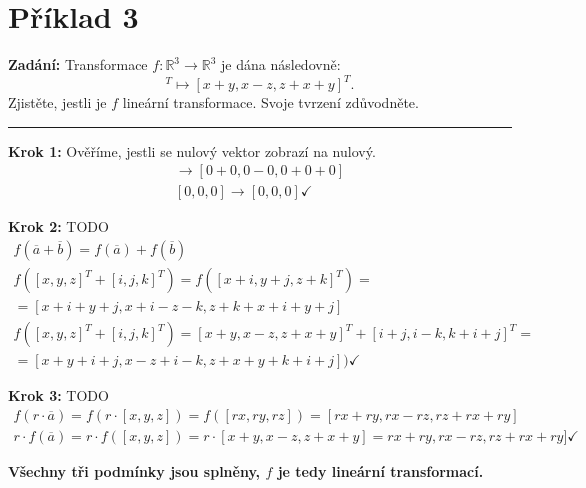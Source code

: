 \section{Příklad 3}
\textbf{Zadání:} Transformace $f: \mathbb{R}^3 \xrightarrow{} \mathbb{R}^3$ je dána následovně:
\begin{displaymath}
[x, y, z]^T \mapsto [x+y, x-z, z+x+y]^T.
\end{displaymath}
Zjistěte, jestli je $f$ lineární transformace. Svoje tvrzení zdůvodněte.
\par\noindent\rule{\textwidth}{0.4pt}

\textbf{Krok 1:} Ověříme, jestli se nulový vektor zobrazí na nulový.
\begin{gather*}
[0, 0, 0] \xrightarrow{} [0+0, 0-0, 0+0+0] \\
[0, 0, 0] \xrightarrow{} [0, 0, 0]  \checkmark
\end{gather*}

\textbf{Krok 2:} TODO
\begin{gather*}
f(\overline{a}+\overline{b}) = f(\overline{a}) + f(\overline{b})\\
f([x, y, z]^T+[i, j, k]^T) = f([x+i, y+j, z+k]^T) =\\= [x+i+y+j, x+i-z-k, z+k+x+i+y+j]\\
f([x, y, z]^T+[i, j, k]^T)=[x+y, x-z, z+x+y]^T+[i+j,i-k,k+i+j]^T =\\=[x+y+i+j, x-z+i-k, z+x+y+k+i+j])\checkmark
\end{gather*}

\textbf{Krok 3:} TODO
\begin{gather*}
f(r\cdot\overline{a}) = f(r\cdot[x,y,z])=f([rx, ry, rz]) = [rx+ry, rx-rz, rz+rx+ry]\\
r\cdot f(\overline{a})=r\cdot f([x,y,z])=r\cdot[x+y,x-z,z+x+y]=rx+ry,rx-rz,rz+rx+ry]\checkmark
\end{gather*}

\textbf{Všechny tři podmínky jsou splněny, $f$ je tedy lineární transformací.}
